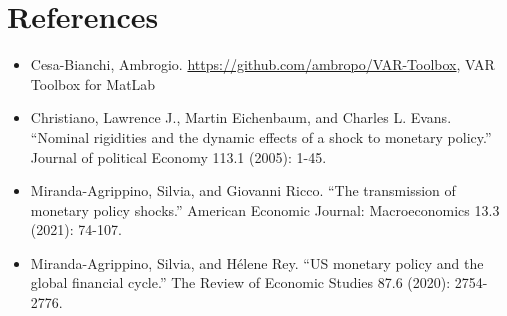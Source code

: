 \documentclass[11pt,a4paper]{article}
\begin{document}




\newpage
\section*{References}
\begin{itemize}
    \item Cesa-Bianchi, Ambrogio. \url{https://github.com/ambropo/VAR-Toolbox}, VAR Toolbox for MatLab
    \item Christiano, Lawrence J., Martin Eichenbaum, and Charles L. Evans. \enquote{Nominal rigidities and the dynamic effects of a shock to monetary policy.} Journal of political Economy 113.1 (2005): 1-45.
    \item Miranda-Agrippino, Silvia, and Giovanni Ricco. \enquote{The transmission of monetary policy shocks.} American Economic Journal: Macroeconomics 13.3 (2021): 74-107.
    \item Miranda-Agrippino, Silvia, and Hélene Rey. \enquote{US monetary policy and the global financial cycle.} The Review of Economic Studies 87.6 (2020): 2754-2776.
    
\end{itemize}
\end{document}
